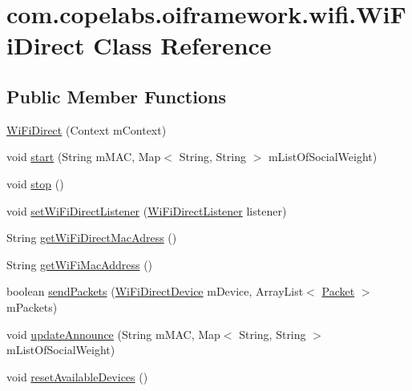 \hypertarget{classcom_1_1copelabs_1_1oiframework_1_1wifi_1_1_wi_fi_direct}{}\section{com.\+copelabs.\+oiframework.\+wifi.\+Wi\+Fi\+Direct Class Reference}
\label{classcom_1_1copelabs_1_1oiframework_1_1wifi_1_1_wi_fi_direct}
\subsection*{Public Member Functions}
\begin{DoxyCompactItemize}
\item 
\hyperlink{classcom_1_1copelabs_1_1oiframework_1_1wifi_1_1_wi_fi_direct_a32ca6cda80db63c97377c6d12fdab8dc}{Wi\+Fi\+Direct} (Context m\+Context)
\item 
void \hyperlink{classcom_1_1copelabs_1_1oiframework_1_1wifi_1_1_wi_fi_direct_ae5c811c9096b1f64c111fcac5186a754}{start} (String m\+M\+A\+C, Map$<$ String, String $>$ m\+List\+Of\+Social\+Weight)
\item 
void \hyperlink{classcom_1_1copelabs_1_1oiframework_1_1wifi_1_1_wi_fi_direct_ada0804ffacb2089d160d425eaacd7521}{stop} ()
\item 
void \hyperlink{classcom_1_1copelabs_1_1oiframework_1_1wifi_1_1_wi_fi_direct_aa8f9c64242b24e2400eb8f9b57acc4de}{set\+Wi\+Fi\+Direct\+Listener} (\hyperlink{interfacecom_1_1copelabs_1_1oiframework_1_1wifi_1_1_wi_fi_direct_listener}{Wi\+Fi\+Direct\+Listener} listener)
\item 
String \hyperlink{classcom_1_1copelabs_1_1oiframework_1_1wifi_1_1_wi_fi_direct_a48ca5225f436474154f94bb102a24f68}{get\+Wi\+Fi\+Direct\+Mac\+Adress} ()
\item 
String \hyperlink{classcom_1_1copelabs_1_1oiframework_1_1wifi_1_1_wi_fi_direct_a6b6c3aa98f1140326f817d3a0492e1b6}{get\+Wi\+Fi\+Mac\+Address} ()
\item 
boolean \hyperlink{classcom_1_1copelabs_1_1oiframework_1_1wifi_1_1_wi_fi_direct_a7a603209094921bf7115e1c9ceec058d}{send\+Packets} (\hyperlink{classcom_1_1copelabs_1_1oiframework_1_1wifi_1_1_wi_fi_direct_device}{Wi\+Fi\+Direct\+Device} m\+Device, Array\+List$<$ \hyperlink{classcom_1_1copelabs_1_1oiframework_1_1contentmanager_1_1_packet}{Packet} $>$ m\+Packets)
\item 
void \hyperlink{classcom_1_1copelabs_1_1oiframework_1_1wifi_1_1_wi_fi_direct_a0204bc98e4ae7f74e7a1418555a022a5}{update\+Announce} (String m\+M\+A\+C, Map$<$ String, String $>$ m\+List\+Of\+Social\+Weight)
\item 
void \hyperlink{classcom_1_1copelabs_1_1oiframework_1_1wifi_1_1_wi_fi_direct_a2133a409235585bcd289b24d83fe2b9c}{reset\+Available\+Devices} ()
\end{DoxyCompactItemize}

